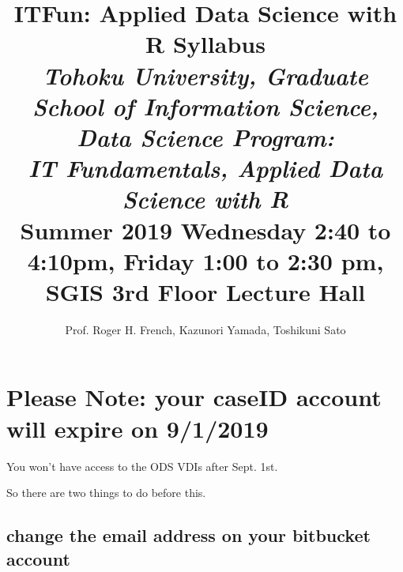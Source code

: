 \documentclass[11pt]{article} %
\title{ITFun: Applied Data Science with R Syllabus \\ \emph{Tohoku University, Graduate School of Information Science, \\ Data Science Program: \\ IT Fundamentals, Applied Data Science with R} \\ Summer 2019 	Wednesday 2:40 to 4:10pm, Friday 1:00 to 2:30 pm, SGIS 3rd Floor Lecture Hall}
\author{Prof. Roger H. French, Kazunori Yamada, Toshikuni Sato}
\begin{document}
\maketitle


%
%
%
%
%

\section{Please Note: your caseID account will expire on 9/1/2019}

  You won't have access to the ODS VDIs after Sept. 1st.
  
  So there are two things to do before this.
  \subsection{change the email address on your bitbucket account}
  
\end{document}
